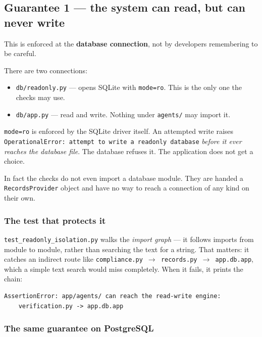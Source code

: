 \documentclass[11pt,a4paper]{article}
\begin{document}
\subsection{Guarantee 1 --- the system can read, but can never write}

This is enforced at the \textbf{database connection}, not by developers
remembering to be careful.

There are two connections:

\begin{itemize}
  \item \texttt{db/readonly.py} --- opens SQLite with \texttt{mode=ro}. This is
        the only one the checks may use.
  \item \texttt{db/app.py} --- read and write. Nothing under \texttt{agents/}
        may import it.
\end{itemize}

\texttt{mode=ro} is enforced by the SQLite driver itself. An attempted write
raises \texttt{OperationalError: attempt to write a readonly database}
\emph{before it ever reaches the database file}. The database refuses it. The
application does not get a choice.

In fact the checks do not even import a database module. They are handed a
\texttt{RecordsProvider} object and have no way to reach a connection of any
kind on their own.

\subsubsection*{The test that protects it}

\texttt{test\_readonly\_isolation.py} walks the \emph{import graph} --- it
follows imports from module to module, rather than searching the text for a
string. That matters: it catches an indirect route like
\texttt{compliance.py $\rightarrow$ records.py $\rightarrow$ app.db.app}, which a
simple text search would miss completely. When it fails, it prints the chain:

\begin{lstlisting}
AssertionError: app/agents/ can reach the read-write engine:
    verification.py -> app.db.app
\end{lstlisting}

\subsubsection*{The same guarantee on PostgreSQL}
\end{document}
